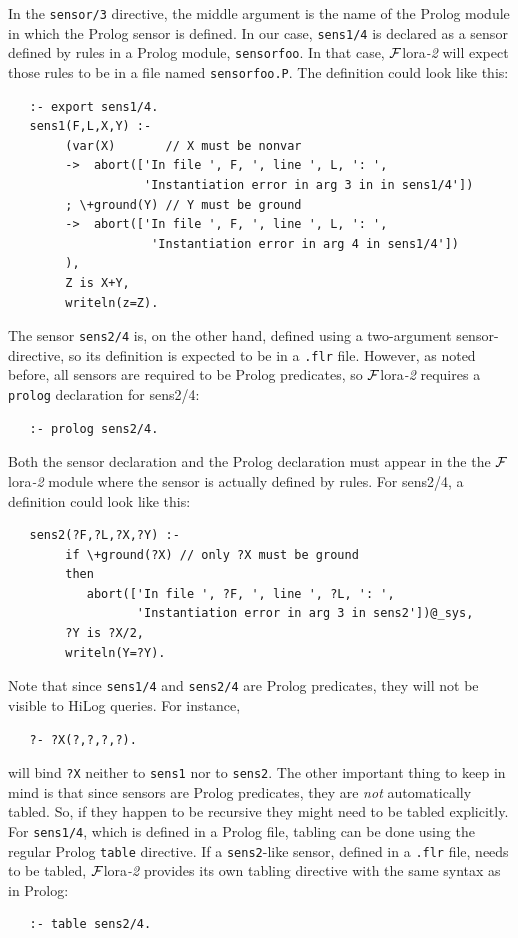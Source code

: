 \documentclass[11pt]{article}
\newcommand{\FLORA}{{\mbox{\sc ${\cal F}${lora}\rm\emph{-2}}}\xspace}
\begin{document}
In the \texttt{sensor/3} directive, the middle argument is the name of the
Prolog module in which the Prolog sensor is defined. 
In our case, \texttt{sens1/4} is declared as a sensor defined by 
rules in a Prolog module, \texttt{sensorfoo}. In that case, \FLORA
will expect those rules to be in a file named \texttt{sensorfoo.P}. The
definition could look like this:
\begin{verbatim}
   :- export sens1/4.
   sens1(F,L,X,Y) :-
        (var(X)       // X must be nonvar
        ->  abort(['In file ', F, ', line ', L, ': ',
                   'Instantiation error in arg 3 in in sens1/4'])
        ; \+ground(Y) // Y must be ground
        ->  abort(['In file ', F, ', line ', L, ': ',
                    'Instantiation error in arg 4 in sens1/4'])
        ),
        Z is X+Y,
        writeln(z=Z).
\end{verbatim}
The sensor \texttt{sens2/4} is, on the other hand, defined using a
two-argument sensor-directive, so its definition is expected to be in a
\texttt{.flr} file. However, as noted before, all sensors are required to
be Prolog predicates, so \FLORA requires a \texttt{prolog} declaration for sens2/4:
\begin{verbatim}
   :- prolog sens2/4.
\end{verbatim}
Both the sensor declaration and the Prolog declaration must appear in the
the \FLORA module where the sensor is actually defined by rules.
For sens2/4, a definition could look like this:
\begin{verbatim}
   sens2(?F,?L,?X,?Y) :-
        if \+ground(?X) // only ?X must be ground
        then
           abort(['In file ', ?F, ', line ', ?L, ': ',
                  'Instantiation error in arg 3 in sens2'])@_sys,
        ?Y is ?X/2,
        writeln(Y=?Y).
\end{verbatim}
Note that since \texttt{sens1/4} and \texttt{sens2/4} are
Prolog predicates, they will not be
visible to HiLog queries. For instance,
\begin{verbatim}
   ?- ?X(?,?,?,?).
\end{verbatim}
will bind \texttt{?X}  neither to \texttt{sens1} nor to \texttt{sens2}.
The other important thing to keep in mind is that since sensors are Prolog
predicates, they are \emph{not} automatically tabled. So, if they happen to
be recursive they might need to be tabled explicitly.
For \texttt{sens1/4},  which is defined in a Prolog file, tabling can be
done using the regular Prolog \texttt{table} directive. If a
\texttt{sens2}-like sensor, defined in a \texttt{.flr} file, needs
to be tabled,
\FLORA provides its own tabling directive with the same
syntax as in Prolog:
\begin{verbatim}
   :- table sens2/4.
\end{verbatim}
\end{document}
